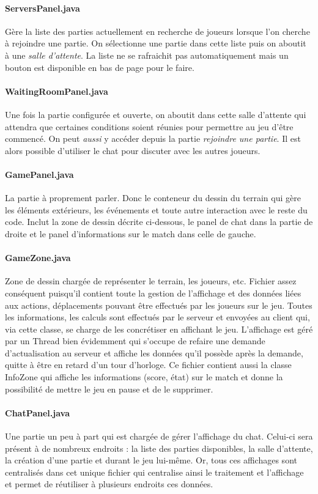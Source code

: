 \documentclass[a4paper,12pt]{report}
\begin{document}
\paragraph{ServersPanel.java}
Gère la liste des parties actuellement en recherche de joueurs lorsque l'on cherche à rejoindre une partie. On sélectionne une partie dans cette liste puis on aboutit à une \emph{salle d'attente}. La liste ne se rafraichit pas automatiquement mais un bouton est disponible en bas de page pour le faire.
\paragraph{WaitingRoomPanel.java}
Une fois la partie configurée et ouverte, on aboutit dans cette salle d'attente qui attendra que certaines conditions soient réunies pour permettre au jeu d'être commencé. On peut \emph{aussi} y accéder depuis la partie \emph{rejoindre une partie}. Il est alors possible d'utiliser le chat pour discuter avec les autres joueurs.
\paragraph{GamePanel.java}
La partie à proprement parler. Donc le conteneur du dessin du terrain qui gère les éléments extérieurs, les événements et toute autre interaction avec le reste du code. Inclut la zone de dessin décrite ci-dessous, le panel de chat dans la partie de droite et le panel d'informations sur le match dans celle de gauche.
\paragraph{GameZone.java}
Zone de dessin chargée de représenter le terrain, les joueurs, etc. Fichier assez conséquent puisqu'il contient toute la gestion de l'affichage et des données liées aux actions, déplacements pouvant être effectués par les joueurs sur le jeu. Toutes les informations, les calculs sont effectués par le serveur et envoyées au client qui, via cette classe, se charge de les concrétiser en affichant le jeu. L'affichage est géré par un Thread bien évidemment qui s'occupe de refaire une demande d'actualisation au serveur et affiche les données qu'il possède après la demande, quitte à être en retard d'un tour d'horloge. Ce fichier contient aussi la classe InfoZone qui affiche les informations (score, état) sur le match et donne la possibilité de mettre le jeu en pause et de le supprimer.
\paragraph{ChatPanel.java}
Une partie un peu à part qui est chargée de gérer l'affichage du chat. Celui-ci sera présent à de nombreux endroits : la liste des parties disponibles, la salle d'attente, la création d'une partie et durant le jeu lui-même. Or, tous ces affichages sont centralisés dans cet unique fichier qui centralise ainsi le traitement et l'affichage et permet de réutiliser à plusieurs endroits ces données.
\end{document}
